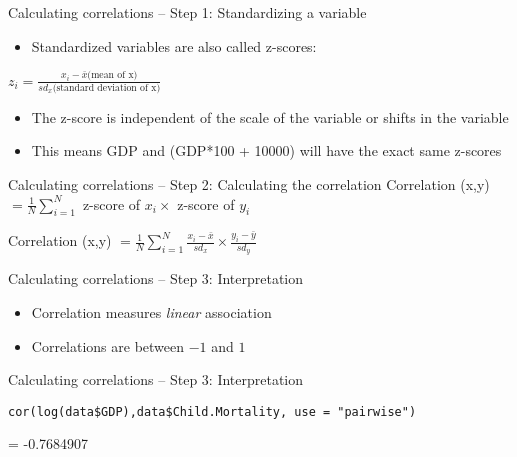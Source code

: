 \documentclass[presentation]{beamer}
\begin{document}
\begin{frame}[label={sec:orgcc086e0}]{Calculating correlations -- Step 1: Standardizing a variable}
\begin{itemize}
\item Standardized variables are also called z-scores:
\end{itemize}
\(z_{i} = \frac{x_{i} - \bar{x} \text{(mean of x)}}{sd_{x} \text{(standard deviation of x)}}\)

\begin{itemize}
\item The z-score is independent of the scale of the variable or shifts in the variable
\end{itemize}
\pause

\begin{itemize}
\item This means GDP and (GDP*100 + 10000) will have the exact same z-scores
\end{itemize}
\end{frame}

\begin{frame}[label={sec:orgc53fd46}]{Calculating correlations -- Step 2: Calculating the correlation}
Correlation (x,y) \(= \frac{1}{N} \sum^{N}_{i=1}\) z-score of \(x_i \times\) z-score of \(y_{i}\)

\pause

Correlation (x,y) \(= \frac{1}{N} \sum^{N}_{i=1} \frac{x_{i} - \bar{x}}{sd_{x}} \times   \frac{y_{i} - \bar{y}}{sd_{y}}\)
\end{frame}

\begin{frame}[label={sec:org28f632b}]{Calculating correlations -- Step 3: Interpretation}
\begin{itemize}
\item Correlation measures \emph{linear} association
\item Correlations are between \(-1\) and \(1\)
\end{itemize}
\end{frame}

\begin{frame}[fragile,label={sec:orge434e17}]{Calculating correlations -- Step 3: Interpretation}
 \begin{verbatim}
cor(log(data$GDP),data$Child.Mortality, use = "pairwise")
\end{verbatim}

= -0.7684907
\end{frame}
\end{document}
